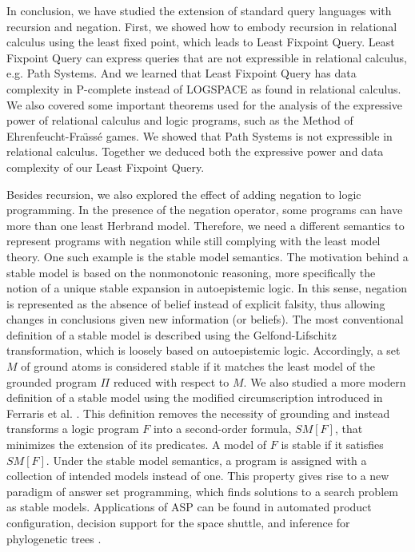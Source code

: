 In conclusion, we have studied the extension of standard query languages with recursion and negation. First, we showed how to embody recursion in relational calculus using the least fixed point, which leads to Least Fixpoint Query. Least Fixpoint Query can express queries that are not expressible in relational calculus, e.g.  Path Systems. And we learned that Least Fixpoint Query has data complexity in P-complete instead of LOGSPACE as found in relational calculus. We also covered some important theorems used for the analysis of the expressive power of relational calculus and logic programs, such as the Method of Ehrenfeucht-Fra\"ıss\'e games. We showed that Path Systems is not expressible in relational calculus. Together we deduced both the expressive power and data complexity of our Least Fixpoint Query. 

Besides recursion, we also explored the effect of adding negation 
to logic programming. In the presence of the negation operator, 
some programs can have more than one least Herbrand model. Therefore, 
we need a different semantics to represent programs with negation 
while still complying with the least model theory. One such 
example is the stable model semantics. The motivation behind 
a stable model is based on the nonmonotonic reasoning, more 
specifically the notion of a unique stable expansion in 
autoepistemic logic. In this sense, negation is represented as 
the absence of belief instead of explicit falsity, thus allowing 
changes in conclusions given new information (or beliefs). The 
most conventional definition of a stable model is described 
using the Gelfond-Lifschitz transformation, which is loosely based on 
autoepistemic logic. Accordingly, a set $M$ of ground atoms is considered 
stable if it matches the least model of the grounded program $\Pi$ reduced 
with respect to $M$. We also studied a more modern definition of a stable 
model using the modified circumscription introduced in Ferraris et al. \cite{lee}. 
This definition removes the necessity of grounding and instead transforms 
a logic program $F$ into a second-order formula, $SM[F]$, that minimizes the extension of 
its predicates. A model of $F$ is stable if it satisfies $SM[F]$. 
Under the stable model semantics, a program is assigned with a 
collection of intended models instead of one. This property 
gives rise to a new paradigm of answer set programming, 
which finds solutions to a search problem as stable models. Applications 
of ASP can be found in automated product configuration, decision 
support for the space shuttle, and inference for phylogenetic trees \cite{lifschitz0}.
